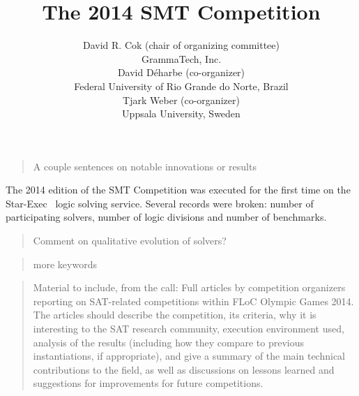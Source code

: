\documentclass[twosize,11pt]{article}
\newcommand{\comment}[2]{\begin{quote}\sc #1\marginpar{\textcolor{red}{$\ast^{\mbox{#2}}$}}\end{quote}}
\newcommand{\davidd}[1]{\comment{#1}{DD}}
\newcommand{\davidc}[1]{\comment{#1}{DC}}
\begin{document}
\title{The 2014 SMT Competition}

\author{
\name David R. Cok (chair of organizing committee)
 \\
\addr GrammaTech, Inc. \\
\AND
\name David D\'{e}harbe (co-organizer)
 \\
\addr Federal University of Rio Grande do Norte, Brazil \\ 
\AND
\name Tjark Weber (co-organizer) \\
\addr Uppsala University, Sweden
}

\maketitle

\davidc{A couple sentences on notable innovations or results}
The 2014 edition of the SMT Competition was executed for the first time on the Star-Exec~\cite{DBLP:conf/cade/StumpST14} logic solving service. Several records were broken: number of participating solvers, number of logic divisions and number of benchmarks.

\davidd{Comment on qualitative evolution of solvers?}
 \davidc{more keywords}


\davidc{Material to include, from the call: Full articles by competition organizers reporting on SAT-related competitions
  within FLoC Olympic Games 2014. The articles should describe the competition,
  its criteria, why it is interesting to the SAT research community, execution
  environment used, analysis of the results (including how they compare to
  previous instantiations, if appropriate), and give a summary of the main
  technical contributions to the field, as well as discussions on lessons
  learned and suggestions for improvements for future competitions. }
	
\end{document}
